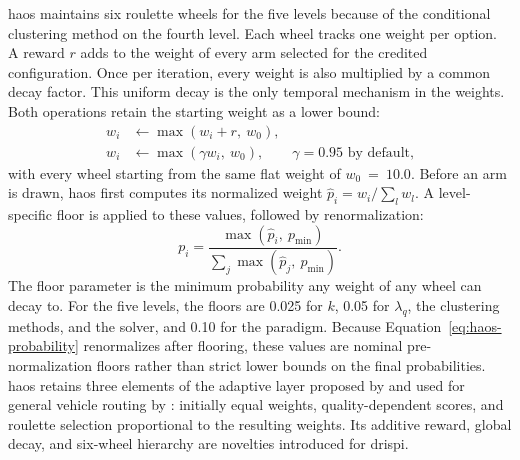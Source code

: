 \begin{algorithm}[tbp]
\caption{Hierarchical Adaptive Operator Selection (\gls{haos})}\label{alg:haos}
\BlankLine
{}
\BlankLine
{}
\BlankLine
{}
\end{algorithm}

\gls{haos} maintains six roulette wheels for the five levels because of the conditional clustering method on the fourth level. Each wheel tracks one weight per option. A reward $r$ adds to the weight of every arm selected for the credited configuration. Once per iteration, every weight is also multiplied by a common decay factor. This uniform decay is the only temporal mechanism in the weights. Both operations retain the starting weight as a lower bound:
\begin{align}
w_i &\leftarrow \max(w_i + r,\ w_0), \label{eq:haos-update}\\
w_i &\leftarrow \max(\gamma w_i,\ w_0), \qquad \gamma = 0.95 \text{ by default,} \label{eq:haos-decay}
\end{align}
with every wheel starting from the same flat weight of $w_0~=~10.0$.  Before an arm is drawn, \gls{haos} first computes its normalized weight $\hat{p}_i = w_i / \sum_l w_l$. A level-specific floor is applied to these values, followed by renormalization:
\begin{equation}
p_i = \frac{\max(\hat{p}_i,\ p_{\mathrm{min}})}{\sum_j \max(\hat{p}_j,\ p_{\mathrm{min}})}.
\label{eq:haos-probability}
\end{equation}
The floor parameter is the minimum probability any weight of any wheel can decay to. For the five levels, the floors are 0.025 for $k$, 0.05 for $\lambda_q$, the clustering methods, and the solver, and 0.10 for the paradigm. Because Equation~\ref{eq:haos-probability} renormalizes after flooring, these values are nominal pre-normalization floors rather than strict lower bounds on the final probabilities. \gls{haos} retains three elements of the adaptive layer proposed by \citet{ropkeAdaptiveLargeNeighborhood2006} and used for general vehicle routing by \citet{pisingerGeneralHeuristicVehicle2007}: initially equal weights, quality-dependent scores, and roulette selection proportional to the resulting weights. Its additive reward, global decay, and six-wheel hierarchy are novelties introduced for \gls{drispi}\@.

